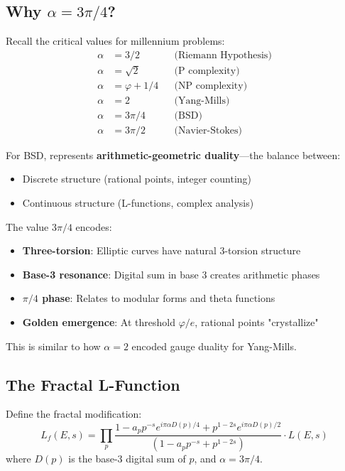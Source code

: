 \subsection{Why $\alpha = 3\pi/4$?}

Recall the critical values for millennium problems:
\begin{align}
\alpha &= 3/2 && \text{(Riemann Hypothesis)} \\
\alpha &= \sqrt{2} && \text{(P complexity)} \\
\alpha &= \varphi + 1/4 && \text{(NP complexity)} \\
\alpha &= 2 && \text{(Yang-Mills)} \\
\alpha &= 3\pi/4 && \text{(BSD)} \\
\alpha &= 3\pi/2 && \text{(Navier-Stokes)}
\end{align}

For BSD,  represents \textbf{arithmetic-geometric duality}—the balance between:
\begin{itemize}
\item Discrete structure (rational points, integer counting)
\item Continuous structure (L-functions, complex analysis)
\end{itemize}

\begin{keyidea}
The value $3\pi/4$ encodes:
\begin{itemize}
\item \textbf{Three-torsion}: Elliptic curves have natural 3-torsion structure
\item \textbf{Base-3 resonance}: Digital sum in base 3 creates arithmetic phases
\item \textbf{$\pi/4$ phase}: Relates to modular forms and theta functions
\item \textbf{Golden emergence}: At threshold $\varphi/e$, rational points "crystallize"
\end{itemize}

This is similar to how $\alpha = 2$ encoded gauge duality for Yang-Mills.
\end{keyidea}

\subsection{The Fractal L-Function}

\begin{defn}\label{def:fractal-l-function}
Define the fractal modification:
\begin{equation}
L_f(E,s) = \prod_p \frac{1 - a_p p^{-s} e^{i\pi\alpha D(p)/4} + p^{1-2s} e^{i\pi\alpha D(p)/2}}{(1 - a_p p^{-s} + p^{1-2s})}
\cdot L(E,s)
\end{equation}
where $D(p)$ is the base-3 digital sum of $p$, and $\alpha = 3\pi/4$.
\end{defn}

